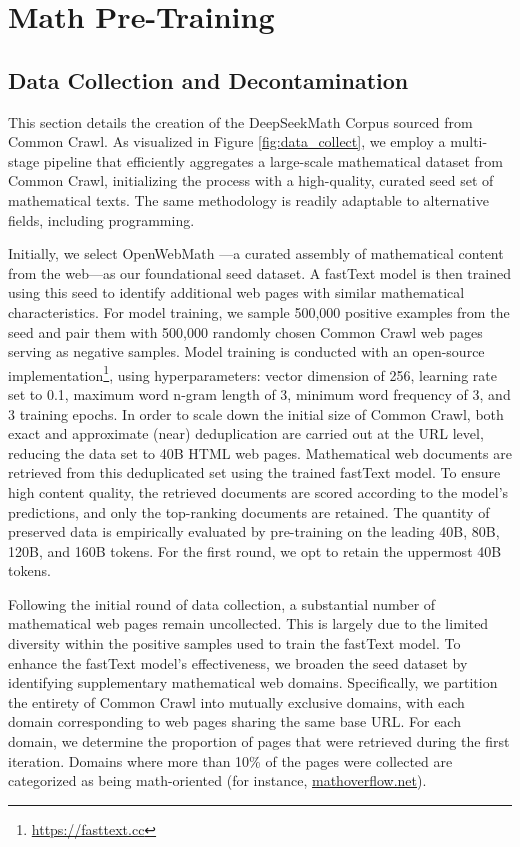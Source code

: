 \section{Math Pre-Training}

\subsection{Data Collection and Decontamination} This section details the creation of the DeepSeekMath Corpus sourced from Common Crawl. As visualized in Figure \ref{fig:data_collect}, we employ a multi-stage pipeline that efficiently aggregates a large-scale mathematical dataset from Common Crawl, initializing the process with a high-quality, curated seed set of mathematical texts. The same methodology is readily adaptable to alternative fields, including programming.

Initially, we select OpenWebMath \citep{openwebmath}—a curated assembly of mathematical content from the web—as our foundational seed dataset. A fastText model \citep{joulin2016fasttext} is then trained using this seed to identify additional web pages with similar mathematical characteristics. For model training, we sample 500,000 positive examples from the seed and pair them with 500,000 randomly chosen Common Crawl web pages serving as negative samples. Model training is conducted with an open-source implementation\footnote{\url{https://fasttext.cc}}, using hyperparameters: vector dimension of 256, learning rate set to 0.1, maximum word n-gram length of 3, minimum word frequency of 3, and 3 training epochs. In order to scale down the initial size of Common Crawl, both exact and approximate (near) deduplication are carried out at the URL level, reducing the data set to 40B HTML web pages. Mathematical web documents are retrieved from this deduplicated set using the trained fastText model. To ensure high content quality, the retrieved documents are scored according to the model’s predictions, and only the top-ranking documents are retained. The quantity of preserved data is empirically evaluated by pre-training on the leading 40B, 80B, 120B, and 160B tokens. For the first round, we opt to retain the uppermost 40B tokens.

Following the initial round of data collection, a substantial number of mathematical web pages remain uncollected. This is largely due to the limited diversity within the positive samples used to train the fastText model. To enhance the fastText model’s effectiveness, we broaden the seed dataset by identifying supplementary mathematical web domains. Specifically, we partition the entirety of Common Crawl into mutually exclusive domains, with each domain corresponding to web pages sharing the same base URL. For each domain, we determine the proportion of pages that were retrieved during the first iteration. Domains where more than 10\% of the pages were collected are categorized as being math-oriented (for instance, \url{mathoverflow.net}). 

